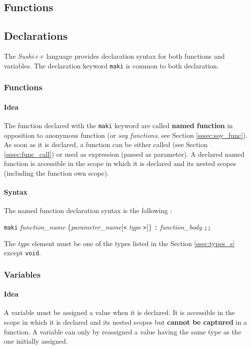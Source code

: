 \documentclass[a4paper,11pt]{article}
\begin{document}
\subsection{Functions}
\label{sssec:functions}

\subsection{Declarations}

The \textit{Sushi++} language provides declaration syntax for both functions and variables. The declaration keyword \texttt{maki} is common to both declaration.

\subsubsection{Functions}
\label{sssec:decl_func}
\paragraph{Idea} The function declared with the \texttt{maki} keyword are called \textbf{named function} in opposition to anonymous function (or \textit{soy functions}, see Section \ref{sssec:soy_func}). As soon as it is declared, a function can be either called (see Section \ref{sssec:func_call}) or used as expression (passed as parameter). A declared named function is accessible in the scope in which it is declared and its nested scopes (including the function own scope).
\paragraph{Syntax}  The named function declaration syntax is the following : 
\begin{center}
\texttt{maki} \textit{function\_name} \{\textit{parameter\_name}[\texttt{<} \textit{type} \texttt{>}]\} \texttt{:} \textit{function\_body} \texttt{;;}
\end{center}
The \textit{type} element must be one of the types listed in the Section \ref{ssec:types_s} except \texttt{void}.
\subsubsection{Variables}
\paragraph{Idea} A variable must be assigned a value when it is declared. It is accessible in the scope in which it is declared and its nested scopes but \textbf{cannot be captured} in a function. A variable can only by reassigned a value having the same type as the one initially assigned.
\end{document}
